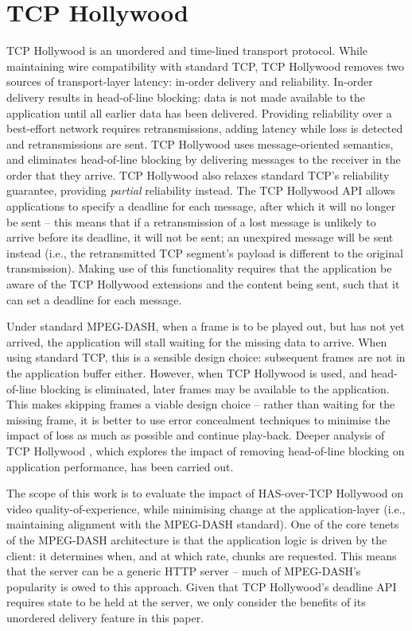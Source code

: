 \section{TCP Hollywood}
\label{sec:hlywd}

TCP Hollywood \cite{mcquistin2016tcp, mcquistin2016tcp2} is an unordered and time-lined
transport protocol. While maintaining wire compatibility with standard TCP, TCP Hollywood
removes two sources of transport-layer latency: in-order delivery and reliability.
In-order delivery results in head-of-line blocking: data is not made available to the
application until all earlier data has been delivered. Providing reliability over a
best-effort network requires retransmissions, adding latency while loss is detected and
retransmissions are sent. TCP Hollywood uses message-oriented semantics, and eliminates
head-of-line blocking by delivering messages to the receiver in the order that they
arrive. TCP Hollywood also relaxes standard TCP's reliability guarantee, providing
\emph{partial} reliability instead. The TCP Hollywood API allows applications to specify a
deadline for each message, after which it will no longer be sent -- this means that if a
retransmission of a lost message is unlikely to arrive before its deadline, it will not be
sent; an unexpired message will be sent instead (i.e., the retransmitted TCP segment's
payload is different to the original transmission). Making use of this functionality
requires that the application be aware of the TCP Hollywood extensions and the content
being sent, such that it can set a deadline for each message.

Under standard MPEG-DASH, when a frame is to be played out, but has not yet arrived, the
application will stall waiting for the missing data to arrive. When using standard TCP,
this is a sensible design choice: subsequent frames are not in the application buffer
either. However, when TCP Hollywood is used, and head-of-line blocking is eliminated,
later frames may be available to the application. This makes skipping frames a viable
design choice -- rather than waiting for the missing frame, it is better to use error
concealment techniques to minimise the impact of loss as much as possible and continue
play-back. Deeper analysis of TCP Hollywood \cite{mcquistin2016tcp, mcquistin2016tcp2},
which explores the impact of removing head-of-line blocking on application performance,
has been carried out.

The scope of this work is to evaluate the impact of HAS-over-TCP Hollywood on video
quality-of-experience, while minimising change at the application-layer (i.e., maintaining
alignment with the MPEG-DASH standard). One of the core tenets of the MPEG-DASH
architecture is that the application logic is driven by the client: it determines when,
and at which rate, chunks are requested. This means that the server can be a generic HTTP
server -- much of MPEG-DASH's popularity is owed to this approach. Given that TCP
Hollywood's deadline API requires state to be held at the server, we only consider the
benefits of its unordered delivery feature in this paper. 